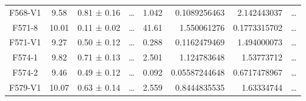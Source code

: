 \documentclass[reprint,%
 amsmath,amssymb,
 aps,
]{revtex4-1}
\begin{document}
\begin{table}[]
\begin{tabular}{cccccrrc}
\rowcolor[HTML]{F3F3F3} 
F568-V1              & 9.58                      & 0.81 ± 0.16           & …                      & 1.042                                                        & 0.1089256463                                                          & 2.142443037                                                           & …                                                             \\
\rowcolor[HTML]{F3F3F3} 
F571-8               & 10.01                     & 0.11 ± 0.02           & …                      & 41.61                                                        & 1.550061276                                                           & 0.1773315702                                                          & …                                                             \\
\rowcolor[HTML]{F3F3F3} 
F571-V1              & 9.27                      & 0.50 ± 0.12           & …                      & 0.288                                                        & 0.1162479469                                                          & 1.494000073                                                           & …                                                             \\
\rowcolor[HTML]{F3F3F3} 
F574-1               & 9.82                      & 0.71 ± 0.13           & …                      & 2.501                                                        & 1.124783648                                                           & 1.53773712                                                            & …                                                             \\
\rowcolor[HTML]{F3F3F3} 
F574-2               & 9.46                      & 0.49 ± 0.12           & …                      & 0.092                                                        & 0.05587244648                                                         & 0.6717478967                                                          & …                                                             \\
\rowcolor[HTML]{F3F3F3} 
F579-V1              & 10.07                     & 0.63 ± 0.14           & …                      & 2.559                                                        & 0.8444835535                                                          & 1.63334744                                                            & …                                                             \\

\end{tabular}
\end{table}
\end{document}
